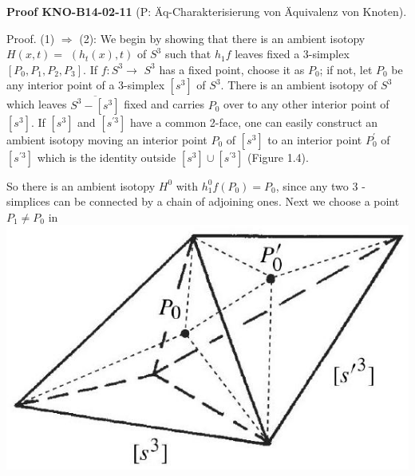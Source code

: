 \documentclass[10pt, letterpaper]{article}
\newcommand{\CustomHeading}[3]{%
  \par\medskip\noindent%
  \textbf{#1 #2} \textnormal{(#3)}.\enskip%
}
\newenvironment{PROOF}[2]{\begin{unitbox}\CustomHeading{Proof}{#1}{#2}}{\end{unitbox}}
\begin{document}
\begin{PROOF}{KNO-B14-02-11}{P: Äq-Charakterisierung von Äquivalenz von Knoten}
Proof. (1) $\Longrightarrow$ (2): We begin by showing that there is an ambient isotopy $H(x, t)=$ $\left(h_{t}(x), t\right)$ of $S^{3}$ such that $h_{1} f$ leaves fixed a 3-simplex $\left[P_{0}, P_{1}, P_{2}, P_{3}\right]$. If $f: S^{3} \rightarrow$ $S^{3}$ has a fixed point, choose it as $P_{0}$; if not, let $P_{0}$ be any interior point of a 3-simplex $\left[s^{3}\right]$ of $S^{3}$. There is an ambient isotopy of $S^{3}$ which leaves $\overline{S^{3}-\left[s^{3}\right]}$ fixed and carries $P_{0}$ over to any other interior point of $\left[s^{3}\right]$. If $\left[s^{3}\right]$ and $\left[s^{\prime 3}\right]$ have a common 2-face, one can easily construct an ambient isotopy moving an interior point $P_{0}$ of $\left[s^{3}\right]$ to an interior point $P_{0}^{\prime}$ of $\left[s^{\prime 3}\right]$ which is the identity outside $\left[s^{3}\right] \cup\left[s^{\prime 3}\right]$ (Figure 1.4).

So there is an ambient isotopy $H^{0}$ with $h_{1}^{0} f\left(P_{0}\right)=P_{0}$, since any two 3 -simplices can be connected by a chain of adjoining ones. Next we choose a point $P_{1} \neq P_{0}$ in\\
\includegraphics[scale=0.2, center]{2025_05_21_9c06be8de7a55410f8c1g-020}


\end{PROOF}
\end{document}
